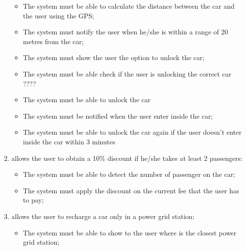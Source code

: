 \begin{enumerate}
\begin{itemize}
\item The system must be able to calculate the distance between the car and the user using the GPS;
\item The system must notify the user when he/she is within a range of 20 metres from the car;
\item The system must show the user the option to unlock the car;
\item The system must be able check if the user is unlocking the correct car ????
\item The system must be able to unlock the car
\item The system must be notified when the user enter inside the car;
\item The system must be able to unlock the car again if the user doesn't enter inside the car within 3 minutes
\end{itemize}

\item allows the user to obtain a 10\% discount if he/she takes at least 2 passengers:
\begin{itemize}
\item The system must be able to detect the number of passenger on the car;
\item The system must apply the discount on the current fee that the user has to pay;
\end{itemize}

\item allows the user to recharge a car only in a power grid station:
\begin{itemize}
\item The system must be able to show to the user where is the closest power grid station;

\end{itemize}
\end{enumerate}
